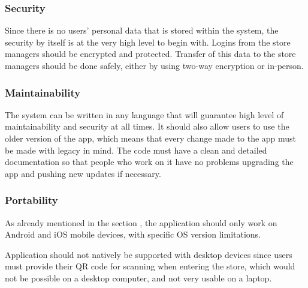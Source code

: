 \subsubsection{Security}
\hspace{\parindent}Since there is no users' personal data that is stored within the system, the security by itself is at the very high level to begin with. Logins from the store managers should be encrypted and protected. Transfer of this data to the store managers should be done safely, either by using two-way encryption or in-person.

\subsubsection{Maintainability}
\hspace{\parindent}The system can be written in any language that will guarantee high level of maintainability and security at all times. It should also allow users to use the older version of the app, which means that every change made to the app must be made with legacy in mind. The code must have a clean and detailed documentation so that people who work on it have no problems upgrading the app and pushing new updates if necessary.

\subsubsection{Portability}
\hspace{\parindent}As already mentioned in the section , the application should only work on Android and iOS mobile devices, with specific OS version limitations.

Application should not natively be supported with desktop devices since users must provide their QR code for scanning when entering the store, which would not be possible on a desktop computer, and not very usable on a laptop.
